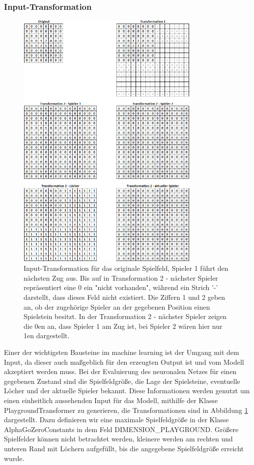 \documentclass[12pt,a4paper]{article}
\begin{document}
\subsubsection{Input-Transformation}
\begin{figure}
	\centering
	\includegraphics[width=0.8\textwidth]{pics/input_transform.png}	
	\caption{Input-Transformation für das originale Spielfeld, Spieler 1 führt den nächsten Zug aus. Bis auf in \glqq Transformation 2 - nächster Spieler\grqq{} repräsentiert eine 0 ein "nicht vorhanden", während ein Strich '-' darstellt, dass dieses Feld nicht existiert. Die Ziffern 1 und 2 geben an, ob der zugehörige Spieler an der gegebenen Position einen Spielstein besitzt. In der \glqq Transformation 2 - nächster Spieler\grqq{} zeigen die 0en an, dass Spieler 1 am Zug ist, bei Spieler 2 wären hier nur 1en dargestellt.}
	\label{fig:input_transformation}
\end{figure}
Einer der wichtigsten Bausteine im machine learning ist der Umgang mit dem Input, da dieser auch maßgeblich für den erzeugten Output ist und vom Modell akzeptiert werden muss. Bei der Evaluierung des neuronalen Netzes für einen gegebenen Zustand sind die Spielfeldgröße, die Lage der Spielsteine, eventuelle Löcher und der aktuelle Spieler bekannt. Diese Informationen werden genutzt um einen einheitlich aussehenden Input für das Modell, mithilfe der Klasse PlaygroundTransformer zu generieren, die Transformationen sind in Abbildung \ref{fig:input_transformation} dargestellt. Dazu definieren wir eine maximale Spielfeldgröße in der Klasse AlphaGoZeroConstants in dem Feld \glqq DIMENSION\_PLAYGROUND\grqq{}. Größere Spielfelder können nicht betrachtet werden, kleinere werden am rechten und unteren Rand mit Löchern aufgefüllt, bis die angegebene Spielfeldgröße erreicht wurde.
\end{document}
